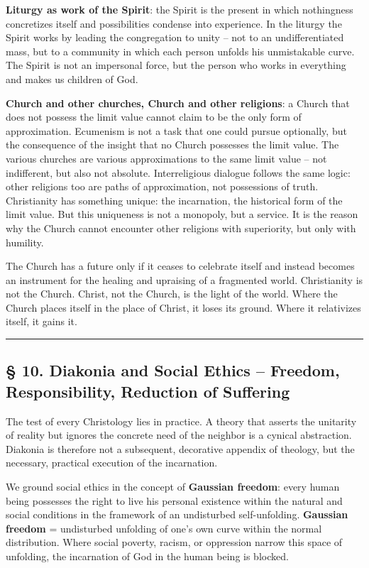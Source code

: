 \documentclass[
  english,
]{article}
\begin{document}
\textbf{Liturgy as work of the Spirit}: the Spirit is the present in
which nothingness concretizes itself and possibilities condense into
experience. In the liturgy the Spirit works by leading the congregation
to unity -- not to an undifferentiated mass, but to a community in which
each person unfolds his unmistakable curve. The Spirit is not an
impersonal force, but the person who works in everything and makes us
children of God.

\textbf{Church and other churches, Church and other religions}: a Church
that does not possess the limit value cannot claim to be the only form
of approximation. Ecumenism is not a task that one could pursue
optionally, but the consequence of the insight that no Church possesses
the limit value. The various churches are various approximations to the
same limit value -- not indifferent, but also not absolute.
Interreligious dialogue follows the same logic: other religions too are
paths of approximation, not possessions of truth. Christianity has
something unique: the incarnation, the historical form of the limit
value. But this uniqueness is not a monopoly, but a service. It is the
reason why the Church cannot encounter other religions with superiority,
but only with humility.

The Church has a future only if it ceases to celebrate itself and
instead becomes an instrument for the healing and upraising of a
fragmented world. Christianity is not the Church. Christ, not the
Church, is the light of the world. Where the Church places itself in the
place of Christ, it loses its ground. Where it relativizes itself, it
gains it.

\begin{center}\rule{0.5\linewidth}{0.5pt}\end{center}

\subsection{§ 10. Diakonia and Social Ethics -- Freedom, Responsibility,
Reduction of
Suffering}\label{diakonia-and-social-ethics-freedom-responsibility-reduction-of-suffering}

The test of every Christology lies in practice. A theory that asserts
the unitarity of reality but ignores the concrete need of the neighbor
is a cynical abstraction. Diakonia is therefore not a subsequent,
decorative appendix of theology, but the necessary, practical execution
of the incarnation.

We ground social ethics in the concept of \textbf{Gaussian freedom}:
every human being possesses the right to live his personal existence
within the natural and social conditions in the framework of an
undisturbed self-unfolding. \textbf{Gaussian freedom} = undisturbed
unfolding of one's own curve within the normal distribution. Where
social poverty, racism, or oppression narrow this space of unfolding,
the incarnation of God in the human being is blocked.
\end{document}
